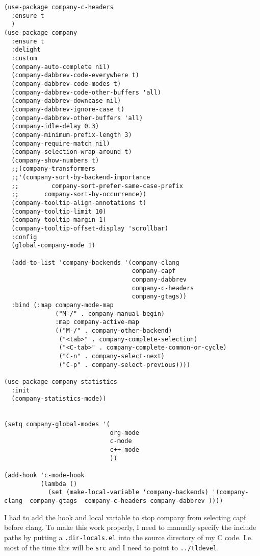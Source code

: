 \documentclass[12pt]{article}
\begin{document}
\begin{verbatim}
(use-package company-c-headers
  :ensure t 
  )
(use-package company
  :ensure t
  :delight
  :custom
  (company-auto-complete nil)
  (company-dabbrev-code-everywhere t)
  (company-dabbrev-code-modes t)
  (company-dabbrev-code-other-buffers 'all)
  (company-dabbrev-downcase nil)
  (company-dabbrev-ignore-case t)
  (company-dabbrev-other-buffers 'all)
  (company-idle-delay 0.3)
  (company-minimum-prefix-length 3)
  (company-require-match nil)
  (company-selection-wrap-around t)
  (company-show-numbers t)
  ;;(company-transformers
  ;;'(company-sort-by-backend-importance
  ;;         company-sort-prefer-same-case-prefix
  ;;       company-sort-by-occurrence))
  (company-tooltip-align-annotations t)
  (company-tooltip-limit 10)
  (company-tooltip-margin 1)
  (company-tooltip-offset-display 'scrollbar)
  :config
  (global-company-mode 1)

  (add-to-list 'company-backends '(company-clang
                                   company-capf
                                   company-dabbrev
                                   company-c-headers
                                   company-gtags))
  :bind (:map company-mode-map
              ("M-/" . company-manual-begin)
              :map company-active-map
              (("M-/" . company-other-backend)
               ("<tab>" . company-complete-selection)
               ("<C-tab>" . company-complete-common-or-cycle)
               ("C-n" . company-select-next)
               ("C-p" . company-select-previous))))

(use-package company-statistics      
  :init
  (company-statistics-mode))


(setq company-global-modes '(
                             org-mode
                             c-mode
                             c++-mode
                             ))

(add-hook 'c-mode-hook
          (lambda ()
            (set (make-local-variable 'company-backends) '(company-clang  company-gtags  company-c-headers company-dabbrev ))))

\end{verbatim}

I had to add the hook and local variable to stop company from selecting capf before clang. 
To make this work properly, I need to manually specify the include paths by
putting a \texttt{.dir-locals.el} into the source directory of my C code. I.e. most
of the time this will be \texttt{src} and I need to point to
\texttt{../tldevel}. 
\end{document}
